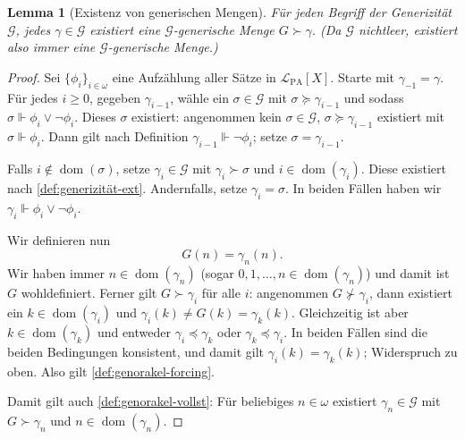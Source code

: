\documentclass[nofonts]{uebung}
\newtheorem{lemma}[theorem]{Lemma}
\theoremstyle{definition}
\DeclareMathOperator{\dom}{dom}
\begin{document}
\begin{lemma}[Existenz von generischen Mengen]\label{lemma:generics-existieren}
    Für jeden Begriff der Generizität $\mathcal G$, jedes $\gamma\in\mathcal G$ existiert eine $\mathcal G$-generische Menge $G\succ \gamma$.
    (Da $\mathcal G$ nichtleer, existiert also immer eine $\mathcal G$-generische Menge.)
\end{lemma}
\begin{proof}
    Sei $\{\phi_i\}_{i\in\omega}$ eine Aufzählung aller Sätze in $\mathcal L_{\mathrm{PA}}[X]$. 
    Starte mit $\gamma_{-1}=\gamma$. Für jedes $i\geq 0$, gegeben $\gamma_{i-1}$, wähle ein $\sigma\in\mathcal G$ mit $\sigma\succeq\gamma_{i-1}$ und sodass $\sigma \Vdash \phi_i\lor\neg\phi_i$. Dieses $\sigma$ existiert: angenommen kein $\sigma\in\mathcal G$, $\sigma\succeq\gamma_{i-1}$ existiert mit $\sigma\Vdash \phi_i$. Dann gilt nach Definition $\gamma_{i-1}\Vdash\neg\phi_i$; setze $\sigma=\gamma_{i-1}$.

    Falls $i\not\in\dom(\sigma)$, setze $\gamma_i\in\mathcal G$ mit $\gamma_i\succ\sigma$ und $i\in\dom(\gamma_i)$. Diese existiert nach \ref{def:generizität-ext}.
    Andernfalls, setze $\gamma_i=\sigma$.
    In beiden Fällen haben wir $\gamma_i\Vdash \phi_i\lor\neg\phi_i$.

    Wir definieren nun
    \[ G(n) = \gamma_n(n). \]
    Wir haben immer $n\in\dom(\gamma_n)$ (sogar $0,1,\dots, n\in\dom(\gamma_n)$) und damit ist $G$ wohldefiniert.
    Ferner gilt $G\succ\gamma_i$ für alle $i$: angenommen $G\not\succ\gamma_i$, dann existiert ein $k\in\dom(\gamma_i)$ und $\gamma_i(k)\neq G(k)=\gamma_k(k)$.
    Gleichzeitig ist aber $k\in\dom(\gamma_k)$ und entweder $\gamma_i\preceq \gamma_k$ oder $\gamma_k\preceq \gamma_i$. In beiden Fällen sind die beiden Bedingungen konsistent, und damit gilt $\gamma_i(k)=\gamma_k(k)$; Widerspruch zu oben.
    Also gilt \ref{def:genorakel-forcing}.

    Damit gilt auch \ref{def:genorakel-vollst}: Für beliebiges $n\in\omega$ existiert $\gamma_n\in\mathcal G$ mit $G\succ \gamma_n$ und $n\in\dom(\gamma_n)$.
\end{proof}
\end{document}
